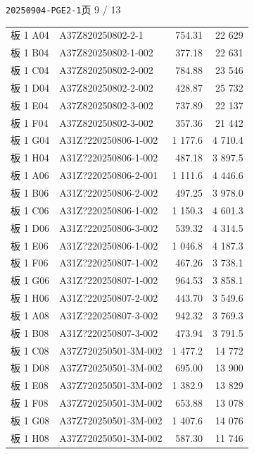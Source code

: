 \documentclass[UTF8,10pt,a4paper,fontset=fandol]{ctexart}
\begin{document}
\newpage

\noindent\texttt{20250904-PGE2-1}\hfill 页 9 / 13

\vspace{0.5em}

\small
\begin{tabular}{@{}p{1.7cm}p{4.1cm}r r@{}}
板 1 A04 & A37Z820250802-2-1 & 754.31 & 22 629 \\
板 1 B04 & A37Z820250802-1-002 & 377.18 & 22 631 \\
板 1 C04 & A37Z820250802-2-002 & 784.88 & 23 546 \\
板 1 D04 & A37Z820250802-2-002 & 428.87 & 25 732 \\
板 1 E04 & A37Z820250802-3-002 & 737.89 & 22 137 \\
板 1 F04 & A37Z820250802-3-002 & 357.36 & 21 442 \\
板 1 G04 & A31Z?220250806-1-002 & 1 177.6 & 4 710.4 \\
板 1 H04 & A31Z?220250806-1-002 & 487.18 & 3 897.5 \\
板 1 A06 & A31Z?220250806-2-001 & 1 111.6 & 4 446.6 \\
板 1 B06 & A31Z?220250806-2-002 & 497.25 & 3 978.0 \\
板 1 C06 & A31Z?220250806-1-002 & 1 150.3 & 4 601.3 \\
板 1 D06 & A31Z?220250806-3-002 & 539.32 & 4 314.5 \\
板 1 E06 & A31Z?220250806-1-002 & 1 046.8 & 4 187.3 \\
板 1 F06 & A31Z?220250807-1-002 & 467.26 & 3 738.1 \\
板 1 G06 & A31Z?220250807-1-002 & 964.53 & 3 858.1 \\
板 1 H06 & A31Z?220250807-2-002 & 443.70 & 3 549.6 \\
板 1 A08 & A31Z?220250807-3-002 & 942.32 & 3 769.3 \\
板 1 B08 & A31Z?220250807-3-002 & 473.94 & 3 791.5 \\
板 1 C08 & A37Z720250501-3M-002 & 1 477.2 & 14 772 \\
板 1 D08 & A37Z720250501-3M-002 & 695.00 & 13 900 \\
板 1 E08 & A37Z720250501-3M-002 & 1 382.9 & 13 829 \\
板 1 F08 & A37Z720250501-3M-002 & 653.88 & 13 078 \\
板 1 G08 & A37Z720250501-3M-002 & 1 407.6 & 14 076 \\
板 1 H08 & A37Z720250501-3M-002 & 587.30 & 11 746 \\

\end{tabular}
\end{document}
